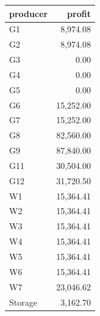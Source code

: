 \begin{tabular}{lr}
\toprule
producer & profit \\
\midrule
G1 & 8,974.08 \\
G2 & 8,974.08 \\
G3 & 0.00 \\
G4 & 0.00 \\
G5 & 0.00 \\
G6 & 15,252.00 \\
G7 & 15,252.00 \\
G8 & 82,560.00 \\
G9 & 87,840.00 \\
G11 & 30,504.00 \\
G12 & 31,720.50 \\
W1 & 15,364.41 \\
W2 & 15,364.41 \\
W3 & 15,364.41 \\
W4 & 15,364.41 \\
W5 & 15,364.41 \\
W6 & 15,364.41 \\
W7 & 23,046.62 \\
Storage & 3,162.70 \\
\bottomrule
\end{tabular}
